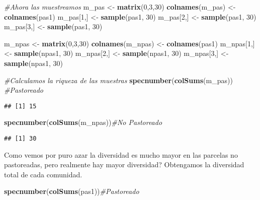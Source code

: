 \documentclass[]{book}
\newenvironment{Shaded}{\begin{snugshade}}{\end{snugshade}}
\newcommand{\KeywordTok}[1]{\textcolor[rgb]{0.13,0.29,0.53}{\textbf{{#1}}}}
\newcommand{\DecValTok}[1]{\textcolor[rgb]{0.00,0.00,0.81}{{#1}}}
\newcommand{\StringTok}[1]{\textcolor[rgb]{0.31,0.60,0.02}{{#1}}}
\newcommand{\CommentTok}[1]{\textcolor[rgb]{0.56,0.35,0.01}{\textit{{#1}}}}
\newcommand{\NormalTok}[1]{{#1}}
\begin{document}
\begin{Shaded}
\begin{Highlighting}[]
\CommentTok{#Ahora las muestreamos}
\NormalTok{m_pas <-}\StringTok{ }\KeywordTok{matrix}\NormalTok{(}\DecValTok{0}\NormalTok{,}\DecValTok{3}\NormalTok{,}\DecValTok{30}\NormalTok{)}
\KeywordTok{colnames}\NormalTok{(m_pas) <-}\StringTok{ }\KeywordTok{colnames}\NormalTok{(pas1)}
\NormalTok{m_pas[}\DecValTok{1}\NormalTok{,] <-}\StringTok{ }\KeywordTok{sample}\NormalTok{(pas1, }\DecValTok{30}\NormalTok{)}
\NormalTok{m_pas[}\DecValTok{2}\NormalTok{,] <-}\StringTok{ }\KeywordTok{sample}\NormalTok{(pas1, }\DecValTok{30}\NormalTok{)}
\NormalTok{m_pas[}\DecValTok{3}\NormalTok{,] <-}\StringTok{ }\KeywordTok{sample}\NormalTok{(pas1, }\DecValTok{30}\NormalTok{)}

\NormalTok{m_npas <-}\StringTok{ }\KeywordTok{matrix}\NormalTok{(}\DecValTok{0}\NormalTok{,}\DecValTok{3}\NormalTok{,}\DecValTok{30}\NormalTok{)}
\KeywordTok{colnames}\NormalTok{(m_npas) <-}\StringTok{ }\KeywordTok{colnames}\NormalTok{(pas1)}
\NormalTok{m_npas[}\DecValTok{1}\NormalTok{,] <-}\StringTok{ }\KeywordTok{sample}\NormalTok{(npas1, }\DecValTok{30}\NormalTok{)}
\NormalTok{m_npas[}\DecValTok{2}\NormalTok{,] <-}\StringTok{ }\KeywordTok{sample}\NormalTok{(npas1, }\DecValTok{30}\NormalTok{)}
\NormalTok{m_npas[}\DecValTok{3}\NormalTok{,] <-}\StringTok{ }\KeywordTok{sample}\NormalTok{(npas1, }\DecValTok{30}\NormalTok{)}

\CommentTok{#Calculamos la riqueza de las muestras}
\KeywordTok{specnumber}\NormalTok{(}\KeywordTok{colSums}\NormalTok{(m_pas)) }\CommentTok{#Pastoreado}
\end{Highlighting}
\end{Shaded}

\begin{verbatim}
## [1] 15
\end{verbatim}

\begin{Shaded}
\begin{Highlighting}[]
\KeywordTok{specnumber}\NormalTok{(}\KeywordTok{colSums}\NormalTok{(m_npas))}\CommentTok{#No Pastoreado}
\end{Highlighting}
\end{Shaded}

\begin{verbatim}
## [1] 30
\end{verbatim}

Como vemos por puro azar la diversidad es mucho mayor en las parcelas no
pastoreadas, pero realmente hay mayor diversidad? Obtengamos la
diversidad total de cada comunidad.

\begin{Shaded}
\begin{Highlighting}[]
\KeywordTok{specnumber}\NormalTok{(}\KeywordTok{colSums}\NormalTok{(pas1))}\CommentTok{#Pastoreado}
\end{Highlighting}
\end{Shaded}
\end{document}

